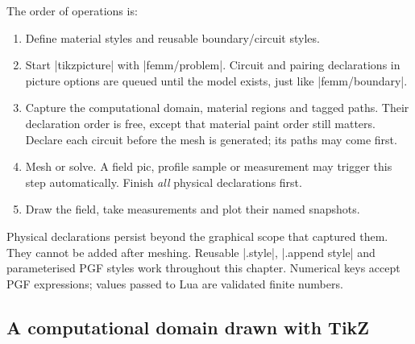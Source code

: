 The order of operations is:
\begin{enumerate}
\item Define material styles and reusable boundary/circuit styles.
\item Start |tikzpicture| with |femm/problem|. Circuit and pairing declarations in
  picture options are queued until the model exists, just like |femm/boundary|.
\item Capture the computational domain, material regions and tagged paths.
  Their declaration order is free, except that material paint order still matters.
  Declare each circuit before the mesh is generated; its paths may come first.
\item Mesh or solve. A field pic, profile sample or measurement may trigger this
  step automatically. Finish \emph{all} physical declarations first.
\item Draw the field, take measurements and plot their named snapshots.
\end{enumerate}
Physical declarations persist beyond the graphical scope that captured them.
They cannot be added after meshing. Reusable |.style|, |.append style| and
parameterised PGF styles work throughout this chapter. Numerical keys accept
PGF expressions; values passed to Lua are validated finite numbers.

\subsection{A computational domain drawn with TikZ}
\begin{codeexample}[width=6cm]
\end{codeexample}

